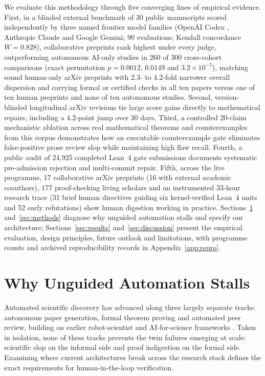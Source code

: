 \documentclass[11pt,a4paper]{article}
\newcommand{\code}[1]{\texttt{\detokenize{#1}}}
\begin{document}
We evaluate this methodology through five converging lines of empirical
evidence. First, in a blinded external benchmark of 30 public manuscripts
scored independently by three named frontier model families (OpenAI Codex
\code{gpt-6.1-sol}, Anthropic Claude \code{claude-opus-5-5} and Google Gemini;
90 evaluations; Kendall concordance $W=0.828$), collaborative preprints rank
highest under every judge, outperforming autonomous AI-only studies in 260 of
300 cross-cohort comparisons (exact permutation $p=0.0012$, $0.0149$ and
$3.2\times10^{-5}$), matching sound human-only arXiv preprints with 2.3- to
4.2-fold narrower overall dispersion and carrying formal or certified checks in
all ten papers versus one of ten human preprints and none of ten autonomous
studies. Second, version-blinded longitudinal arXiv revisions tie large score
gains directly to mathematical repairs, including a 4.2-point jump over 30
days. Third, a controlled 20-claim mechanistic ablation across real
mathematical theorems and counterexamples from this corpus demonstrates how an
executable counterexample gate eliminates false-positive prose review slop
while maintaining high flaw recall. Fourth, a public audit of 24,925 completed
Lean~4 gate submissions documents systematic pre-admission rejection and
multi-commit repair. Fifth, across the live programme, 17 collaborative arXiv
preprints (16 with external academic coauthors), 177 proof-checking living
scholars and an instrumented 33-hour research trace (31 brief human directives
guiding six kernel-verified Lean~4 units and 52 early refutations) show human
digestion working in practice. Sections~\ref{sec:position}
and~\ref{sec:methods} diagnose why unguided automation stalls and specify our
architecture; Sections~\ref{sec:results} and~\ref{sec:discussion} present the
empirical evaluation, design principles, future outlook and limitations, with
programme counts and archived reproducibility records in
Appendix~\ref{app:repro}.

\section{Why Unguided Automation Stalls}
\label{sec:position}
Automated scientific discovery has advanced along three largely separate
tracks: autonomous paper generation, formal theorem proving and automated peer
review, building on earlier robot-scientist and AI-for-science frameworks
\citep{king,gil,kitano,wangsci,deepresearchsurvey}. Taken in isolation, none of
these tracks prevents the twin failures emerging at scale: scientific slop on
the informal side and proof indigestion on the formal side. Examining where
current architectures break across the research stack defines the exact
requirements for human-in-the-loop verification.
\end{document}

